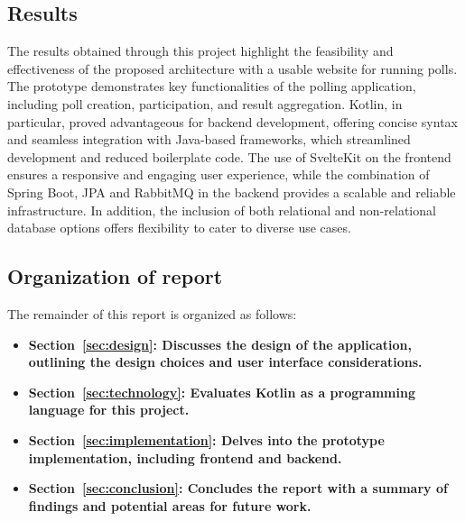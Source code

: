 \subsection{Results}
The results obtained through this project highlight the feasibility and effectiveness of the proposed architecture with a usable website for running polls.
The prototype demonstrates key functionalities of the polling application, including poll creation, participation, and result aggregation.
Kotlin, in particular, proved advantageous for backend development, offering concise syntax and seamless integration with Java-based frameworks, which streamlined development and reduced boilerplate code.
The use of SvelteKit on the frontend ensures a responsive and engaging user experience, while the combination of Spring Boot, JPA and RabbitMQ in the backend provides a scalable and reliable infrastructure.
In addition, the inclusion of both relational and non-relational database options offers flexibility to cater to diverse use cases. \\

\subsection{Organization of report}
The remainder of this report is organized as follows:
\begin{itemize}
    \item \textbf{Section~\ref{sec:design}: Discusses the design of the application, outlining the design choices and user interface considerations.}
    \item \textbf{Section~\ref{sec:technology}: Evaluates Kotlin as a programming language for this project.}
    \item \textbf{Section~\ref{sec:implementation}: Delves into the prototype implementation, including frontend and backend.}
    \item \textbf{Section~\ref{sec:conclusion}: Concludes the report with a summary of findings and potential areas for future work.}
\end{itemize}
